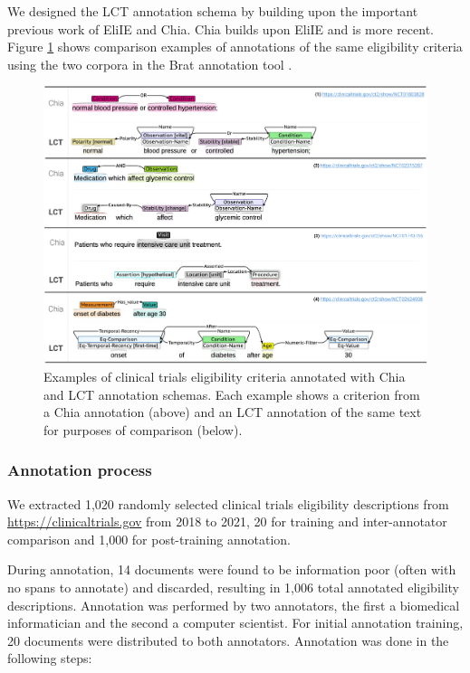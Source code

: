 \documentclass[../main.tex]{subfiles}
\begin{document}
We designed the LCT annotation schema by building upon the important previous work of EliIE and Chia. Chia builds upon EliIE and is more recent. Figure \ref{aim1_fig_chia_vs_lct} shows comparison examples of annotations of the same eligibility criteria using the two corpora in the Brat annotation tool \cite{stenetorp2012brat}. \\

\begin{figure}[h!]
  \includegraphics[scale=0.56]{Figures/Aim1/aim1_chia_vs_lct.pdf}  
    \caption{Examples of clinical trials eligibility criteria annotated with Chia and LCT annotation schemas. Each example shows a criterion from a Chia annotation (above) and an LCT annotation of the same text for purposes of comparison (below).}
    \label{aim1_fig_chia_vs_lct}
\end{figure}

\subsubsection{Annotation process}

We extracted 1,020 randomly selected clinical trials eligibility descriptions from \url{https://clinicaltrials.gov} from 2018 to 2021, 20 for training and inter-annotator comparison and 1,000 for post-training annotation. 

During annotation, 14 documents were found to be information poor (often with no spans to annotate) and discarded, resulting in 1,006 total annotated eligibility descriptions. Annotation was performed by two annotators, the first a biomedical informatician and the second a computer scientist. For initial annotation training, 20 documents were distributed to both annotators. Annotation was done in the following steps:
\end{document}
